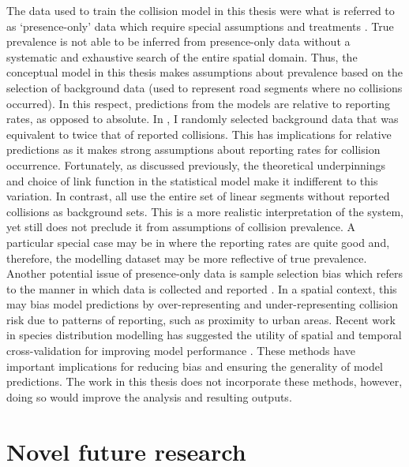 The data used to train the collision model in this thesis were what is referred to as `presence-only' data which require special assumptions and treatments \citep{hast13,wart13}. True prevalence is not able to be inferred from presence-only data without a systematic and exhaustive search of the entire spatial domain. Thus, the conceptual model in this thesis makes assumptions about prevalence based on the selection of background data (used to represent road segments where no collisions occurred). In this respect, predictions from the models are relative to reporting rates, as opposed to absolute.  In , I randomly selected background data that was equivalent to twice that of reported collisions. This has implications for relative predictions as it makes strong assumptions about reporting rates for collision occurrence. Fortunately, as discussed previously, the theoretical underpinnings and choice of link function in the statistical model make it indifferent to this variation. In contrast,  all use the entire set of linear segments without reported collisions as background sets. This is a more realistic interpretation of the system, yet still does not preclude it from assumptions of collision prevalence. A particular special case may be in  where the reporting rates are quite good and, therefore, the modelling dataset may be more reflective of true prevalence. Another potential issue of presence-only data is sample selection bias which refers to the manner in which data is collected and reported \citep{phil09}. In a spatial context, this may bias model predictions by over-representing and under-representing collision risk due to patterns of reporting, such as proximity to urban areas. Recent work in species distribution modelling has suggested the utility of spatial and temporal cross-validation for improving model performance \citep{weng12,robe17}. These methods have important implications for reducing bias and ensuring the generality of model predictions. The work in this thesis does not incorporate these methods, however, doing so would improve the analysis and resulting outputs.

\section{Novel future research}

